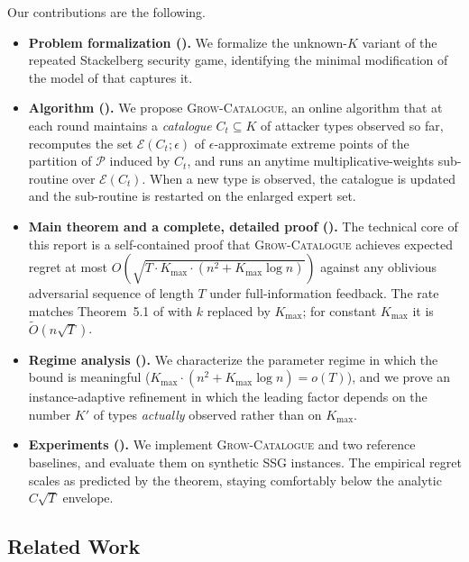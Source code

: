 \documentclass[letterpaper,9pt,twocolumn]{extarticle}
\newcommand{\cP}{\mathcal{P}}
\newcommand{\cE}{\mathcal{E}}
\newcommand{\Kmax}{K_{\max}}
\theoremstyle{plain}
\theoremstyle{definition}
\theoremstyle{remark}
\begin{document}
Our contributions are the following.
\begin{itemize}[leftmargin=1.1em,itemsep=0.10em,topsep=0.2em]
  \item \textbf{Problem formalization ().}
    We formalize the unknown-$K$ variant of the repeated Stackelberg
    security game, identifying the minimal modification of the model of
    \citet{balcan2015} that captures it.
  \item \textbf{Algorithm ().}
    We propose \textsc{Grow-Catalogue}, an online algorithm that at each
    round maintains a \emph{catalogue} $C_t\subseteq K$ of attacker types
    observed so far, recomputes the set $\cE(C_t;\epsilon)$ of
    $\epsilon$-approximate extreme points of the partition of $\cP$
    induced by $C_t$, and runs an anytime multiplicative-weights
    sub-routine over $\cE(C_t)$. When a new type is observed, the
    catalogue is updated and the sub-routine is restarted on the enlarged
    expert set.
  \item \textbf{Main theorem and a complete, detailed proof
    ().}
    The technical core of this report is a self-contained proof that
    \textsc{Grow-Catalogue} achieves expected regret at most
    $O(\sqrt{T\cdot\Kmax\cdot(n^2+\Kmax\log n)})$ against any oblivious
    adversarial sequence of length $T$ under full-information feedback.
    The rate matches Theorem~5.1 of \citet{balcan2015} with $k$ replaced
    by $\Kmax$; for constant $\Kmax$ it is $\tilde O(n\sqrt T)$.
  \item \textbf{Regime analysis ().}
    We characterize the parameter regime in which the bound is meaningful
    ($\Kmax\cdot(n^2+\Kmax\log n)=o(T)$), and we prove an
    instance-adaptive refinement in which the leading factor depends on
    the number $K'$ of types \emph{actually} observed rather than on
    $\Kmax$.
  \item \textbf{Experiments ().}
    We implement \textsc{Grow-Catalogue} and two reference baselines, and
    evaluate them on synthetic SSG instances. The empirical regret scales
    as predicted by the theorem, staying comfortably below the analytic
    $C\sqrt{T}$ envelope.
\end{itemize}

\subsection{Related Work}
\label{sec:related}
\end{document}
